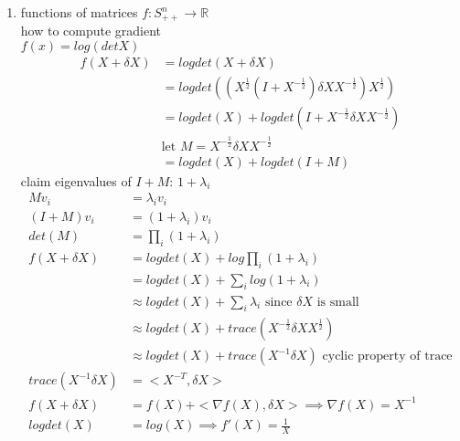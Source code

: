 \documentclass[12pt,letter]{article}
\newcommand{\R}{\mathbb{R}}
\begin{document}
\begin{enumerate}
  \pagebreak
  
\item functions of matrices $f:S_{++}^n \to \R$\\
  how to compute gradient\\
  $f(x)=log(det X)$\\
  \begin{align*}
    f(X+\delta X) &= logdet(X+\delta X)\\
                  &= logdet((X^{\frac{1}{2}}(I+X^{-\frac{1}{2}}) \delta X X^{-\frac{1}{2}})X^{\frac{1}{2}})\\
                  &= logdet(X)+logdet(I+X^{-\frac{1}{2}} \delta X X^{-\frac{1}{2}})\\
                  & \text{let } M = X^{-\frac{1}{2}} \delta X X^{-\frac{1}{2}}\\
                  &= logdet(X)+logdet(I+M)
  \end{align*}
  claim eigenvalues of $I+M$: $1+\lambda_i$
  \begin{align*}
    Mv_i &= \lambda_i v_i\\
    (I+M)v_i &= (1+\lambda_i)v_i\\
    det(M)&=\prod_i(1+\lambda_i)\\
    f(X+\delta X) &= logdet(X) + log \prod_i(1+\lambda_i)\\
         &= logdet(X) + \sum_i log(1+\lambda_i)\\
         &\approx logdet(X) + \sum_i \lambda_i \text{ since } \delta X \text{ is small}\\
         &\approx logdet(X) + trace(X^{-\frac{1}{2}} \delta X X^{\frac{1}{2}})\\
         &\approx logdet(X) + trace(X^{-1} \delta X) \text{ cyclic property of trace}\\
    trace(X^{-1} \delta X) &= <X^{-T},\delta X>\\
    f(X+\delta X) &= f(X) + <\nabla f(X), \delta X> \implies \nabla f(X) = X^{-1}\\
    logdet(X) &= log(X) \implies f'(X)=\frac{1}{X}
  \end{align*}

  \pagebreak
  

\end{enumerate}
\end{document}
